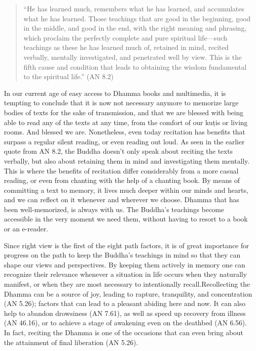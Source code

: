 \begin{quote}
  ``He has learned much, remembers what he has learned, and accumulates what he has learned. Those teachings that are good in the beginning, good in the middle, and good in the end, with the right meaning and phrasing, which proclaim the perfectly complete and pure spiritual life—such teachings as these he has learned much of, retained in mind, recited verbally, mentally investigated, and penetrated well by view. This is the fifth cause and condition that leads to obtaining the wisdom fundamental to the spiritual life.'' (AN 8.2)
\end{quote}

In our current age of easy access to Dhamma books and multimedia, it is tempting to conclude that it is now not necessary anymore to memorize large bodies of texts for the sake of transmission, and that we are blessed with being able to read any of the texts at any time, from the comfort of our kuṭis or living rooms. And blessed we are. Nonetheless, even today recitation has benefits that surpass a regular silent reading, or even reading out loud. As seen in the earlier quote from AN 8.2, the Buddha doesn't only speak about reciting the texts verbally, but also about retaining them in mind and investigating them mentally. This is where the benefits of recitation differ considerably from a more casual reading, or even from chanting with the help of a chanting book. By means of committing a text to memory, it lives much deeper within our minds and hearts, and we can reflect on it whenever and wherever we choose. Dhamma that has been well-memorized, is always with us. The Buddha's teachings become accessible in the very moment we need them, without having to \ifninebythirteen\enlargethispage{1\baselineskip}\fi resort to a book or an e-reader.

Since right view is the first of the eight path factors, it is of great importance for progress on the path to keep the Buddha's teachings in mind so that they can shape our views and perspectives. By keeping them actively in memory one can recognize their relevance whenever a situation in life occurs when they naturally manifest, or when they are most necessary to intentionally recall.\ifbfive\clearpage\fi Recollecting the Dhamma can be a source of joy, leading to rapture, tranquility, and concentration (AN 5.26); factors that can lead to a pleasant abiding here and now. It can also help to abandon drowsiness (AN 7.61), as well as speed up recovery from illness (AN 46.16), or to achieve a stage of awakening even on the deathbed (AN 6.56). In fact, reciting the Dhamma is one of the occasions that can even bring about the attainment of final liberation (AN 5.26).

